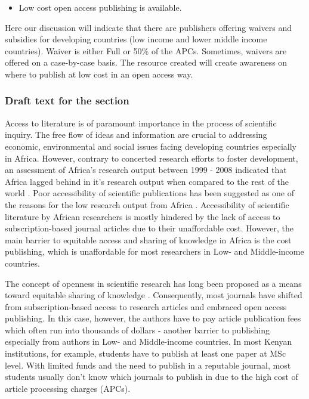 \begin{itemize}
\tightlist
\item
  Low cost open access publishing is available.
\end{itemize}

Here our discussion will indicate that there are publishers offering
waivers and subsidies for developing countries (low income and lower
middle income countries). Waiver is either Full or 50\% of the APCs.
Sometimes, waivers are offered on a case-by-case basis. The resource
created will create awareness on where to publish at low cost in an open
access way.

\subsubsection{Draft text for the
section}\label{draft-text-for-the-section}

Access to literature is of paramount importance in the process of
scientific inquiry. The free flow of ideas and information are crucial
to addressing economic, environmental and social issues facing
developing countries especially in Africa. However, contrary to
concerted research efforts to foster development, an assessment of
Africa's research output between 1999 - 2008 indicated that Africa
lagged behind in it's research output when compared to the rest of the
world \cite{adams2010;raju2012}. Poor accessibility of scientific
publications has been suggested as one of the reasons for the low
research output from Africa \cite{tise2011;raju2012}. Accessibility of
scientific literature by African researchers is mostly hindered by the
lack of access to subscription-based journal articles due to their
unaffordable cost. However, the main barrier to equitable access and
sharing of knowledge in Africa is the cost publishing, which is
unaffordable for most researchers in Low- and Middle-income countries.

The concept of openness in scientific research has long been proposed as
a means toward equitable sharing of knowledge
\cite{burton_sharing_2011;nikos_building_2019}. Consequently, most
journals have shifted from subscription-based access to research
articles and embraced open access publishing. In this case, however, the
authors have to pay article publication fees which often run into
thousands of dollars - another barrier to publishing especially from
authors in Low- and Middle-income countries. In most Kenyan
institutions, for example, students have to publish at least one paper
at MSc level. With limited funds and the need to publish in a reputable
journal, most students usually don't know which journals to publish in
due to the high cost of article processing charges (APCs).

